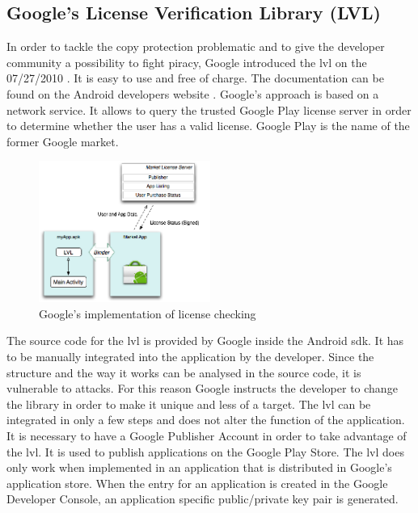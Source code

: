 \subsection{Google's License Verification Library (LVL)} \label{section:license-google}
In order to tackle the copy protection problematic and to give the developer community a possibility to fight piracy, Google introduced the \gls{lvl} on the 07/27/2010 \cite{developersLicensingBlog}.
It is easy to use and free of charge.
The documentation can be found on the Android developers website \cite{developersLicensingOverview}.
\newline
Google's approach is based on a network service.
It allows to query the trusted Google Play license server in order to determine whether the user has a valid license.
Google Play is the name of the former Google market.
\newline
\begin{figure}[h]
    \centering
    \includegraphics[width=0.5\textwidth]{data/lvl.png}
    \caption{Google's implementation of license checking \cite{developersLicensingOverview}}
    \label{fig:lvl}
\end{figure}
The source code for the \gls{lvl} is provided by Google inside the Android \gls{sdk}.
It has to be manually integrated into the application by the developer.
Since the structure and the way it works can be analysed in the source code, it is vulnerable to attacks.
For this reason Google instructs the developer to change the library in order to make it unique and less of a target.
The \gls{lvl} can be integrated in only a few steps and does not alter the function of the application.
\newline
It is necessary to have a Google Publisher Account in order to take advantage of the \gls{lvl}.
It is used to publish applications on the Google Play Store.
The \gls{lvl} does only work when implemented in an application that is distributed in Google's application store.
When the entry for an application is created in the Google Developer Console, an application specific public/private key pair is generated.
